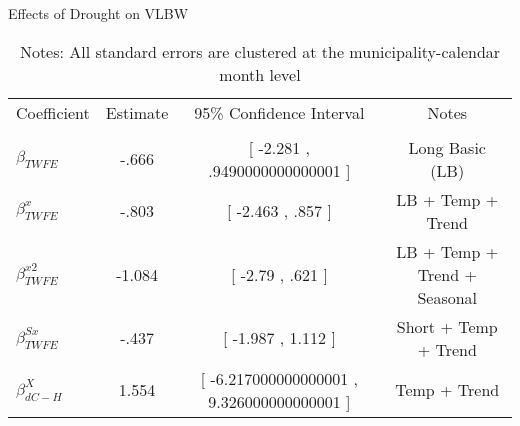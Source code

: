 \begin{table}[!ht]
\centering
\caption{Effects of Drought on VLBW}\label{tab:twfe_vlbw_test}
\renewcommand{\arraystretch}{1.5}
\fontsize{10pt}{12pt}\selectfont
\begin{tabular}{lccc}
\toprule
 \multicolumn{1}{c}{Coefficient}  &\multicolumn{1}{c}{Estimate}&\multicolumn{1}{c}{95\% Confidence Interval}&\multicolumn{1}{c}{Notes}\\\cmidrule(lr){2-2}\cmidrule(lr){3-3}\cmidrule(lr){4-4} \\
\midrule
 $ \beta_{TWFE} $ & -.666  & [ -2.281 ,  .9490000000000001 ] & Long Basic (LB) \\
 $ \beta^{x}_{TWFE} $ & -.803  &  [ -2.463 ,  .857  ] & LB + Temp + Trend \\
 $ \beta^{x2}_{TWFE} $ & -1.084  & [ -2.79 ,  .621  ] & LB + Temp + Trend + Seasonal \\
 $ \beta^{Sx}_{TWFE} $ & -.437  & [ -1.987 ,  1.112  ] & Short + Temp + Trend \\
 $ \beta^{X}_{dC-H} $ & 1.554  & [ -6.217000000000001 ,  9.326000000000001 ] & Temp + Trend \\
\bottomrule
\end{tabular}
\caption*{\footnotesize{Notes: All standard errors are clustered at the municipality-calendar month level}}
\end{table}
